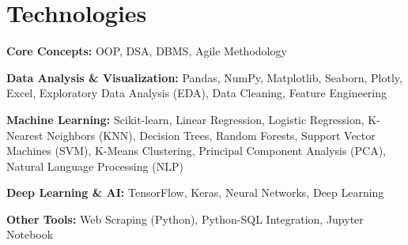 \section{Technologies}

\begin{onecolentry}
    \textbf{Core Concepts:} OOP, DSA, DBMS, Agile Methodology
\end{onecolentry}

\begin{onecolentry}
    \textbf{Data Analysis \& Visualization:} Pandas, NumPy, Matplotlib, Seaborn, Plotly, Excel, Exploratory Data Analysis (EDA), Data Cleaning, Feature Engineering
\end{onecolentry}

\begin{onecolentry}
    \textbf{Machine Learning:} Scikit-learn, Linear Regression, Logistic Regression, K-Nearest Neighbors (KNN), Decision Trees, Random Forests, Support Vector Machines (SVM), K-Means Clustering, Principal Component Analysis (PCA), Natural Language Processing (NLP)
\end{onecolentry}

\begin{onecolentry}
    \textbf{Deep Learning \& AI:} TensorFlow, Keras, Neural Networks, Deep Learning
\end{onecolentry}

\begin{onecolentry}
    \textbf{Other Tools:} Web Scraping (Python), Python-SQL Integration, Jupyter Notebook
\end{onecolentry}
